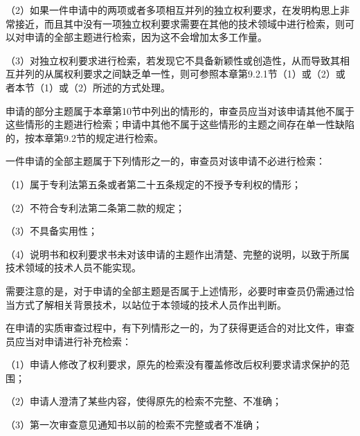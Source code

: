 {\setlength{\parindent}{17.1bp}（2）如果一件申请中的两项或者多项相互并列的独立权利要求，在发明构思上非常接近，而且其中没有一项独立权利要求需要在其他的技术领域中进行检索，则可以对申请的全部主题进行检索，因为这不会增加太多工作量。\par}

{\setlength{\parindent}{17.1bp}（3）对独立权利要求进行检索，若发现它不具备新颖性或创造性，从而导致其相互并列的从属权利要求之间缺乏单一性，则可参照本章第9.2.1节（1）或（2）或者本节（1）或（2）所述的方式处理。\par}

申请的部分主题属于本章第10节中列出的情形的，审查员应当对该申请其他不属于这些情形的主题进行检索；申请中其他不属于这些情形的主题之间存在单一性缺陷的，按本章第9.2节的规定进行检索。

一件申请的全部主题属于下列情形之一的，审查员对该申请不必进行检索：

{\setlength{\parindent}{17.1bp}（1）属于专利法第五条或者第二十五条规定的不授予专利权的情形；\par}

{\setlength{\parindent}{17.1bp}（2）不符合专利法第二条第二款的规定；\par}

{\setlength{\parindent}{17.1bp}（3）不具备实用性；\par}

{\setlength{\parindent}{17.1bp}（4）说明书和权利要求书未对该申请的主题作出清楚、完整的说明，以致于所属技术领域的技术人员不能实现。\par}

需要注意的是，对于申请的全部主题是否属于上述情形，必要时审查员仍需通过恰当方式了解相关背景技术，以站位于本领域的技术人员作出判断。

在申请的实质审查过程中，有下列情形之一的，为了获得更适合的对比文件，审查员应当对申请进行补充检索：

{\setlength{\parindent}{17.1bp}（1）申请人修改了权利要求，原先的检索没有覆盖修改后权利要求请求保护的范围；\par}

{\setlength{\parindent}{17.1bp}（2）申请人澄清了某些内容，使得原先的检索不完整、不准确；\par}

{\setlength{\parindent}{17.1bp}（3）第一次审查意见通知书以前的检索不完整或者不准确；\par}


